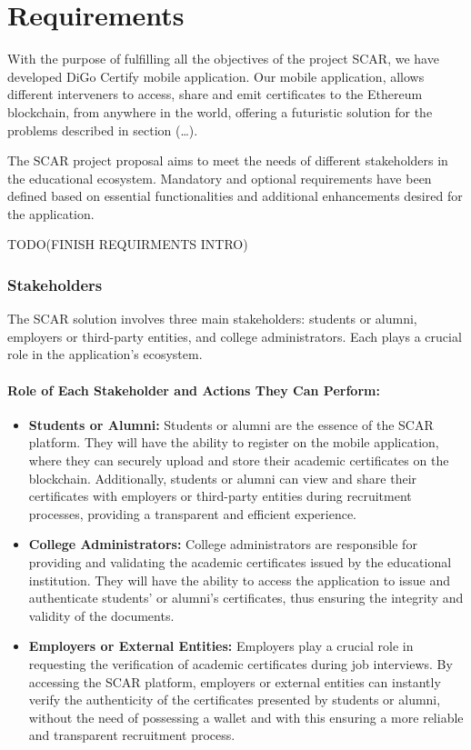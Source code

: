 %
%
\chapter{Requirements}\label{chap:requirements}

With the purpose of fulfilling all the objectives of the project SCAR, we have developed DiGo Certify mobile application. Our mobile application, allows different interveners to access, share and emit certificates to the Ethereum blockchain, from anywhere in the world, offering a futuristic solution for the problems described in section (…).

The SCAR project proposal aims to meet the needs of different stakeholders in the educational ecosystem. Mandatory and optional requirements have been defined based on essential functionalities and additional enhancements desired for the application.

TODO(FINISH REQUIRMENTS INTRO)

\subsection{Stakeholders}\label{subsec:stakeholders}
The SCAR solution involves three main stakeholders: students or alumni, employers or third-party entities, and college administrators. Each plays a crucial role in the application's ecosystem.

\subsubsection{Role of Each Stakeholder and Actions They Can Perform:}

\begin{itemize}

    \item \textbf{Students or Alumni:} Students or alumni are the essence of the SCAR platform. They will have the ability to register on the mobile application, where they can securely upload and store their academic certificates on the blockchain. Additionally, students or alumni can view and share their certificates with employers or third-party entities during recruitment processes, providing a transparent and efficient experience.

    \item \textbf{College Administrators:} College administrators are responsible for providing and validating the academic certificates issued by the educational institution. They will have the ability to access the application to issue and authenticate students' or alumni's certificates, thus ensuring the integrity and validity of the documents.

    \item \textbf{Employers or External Entities:} Employers play a crucial role in requesting the verification of academic certificates during job interviews. By accessing the SCAR platform, employers or external entities can instantly verify the authenticity of the certificates presented by students or alumni, without the need of possessing a wallet and with this ensuring a more reliable and transparent recruitment process.

\end{itemize}

